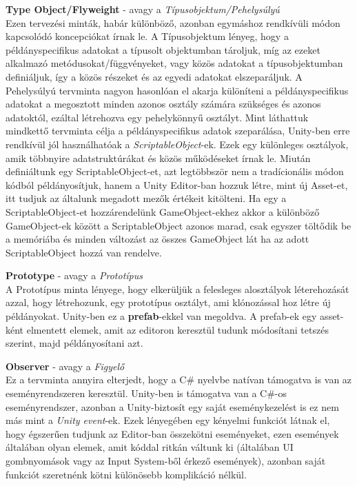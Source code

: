 \textbf{Type Object/Flyweight} - avagy a \textit{Típusobjektum/Pehelysúlyú}\\
Ezen tervezési minták, habár különböző, azonban egymáshoz rendkívüli módon kapcsolódó koncepciókat írnak le. A Típusobjektum lényeg, hogy a példányspecifikus adatokat a típusolt objektumban tároljuk, míg az ezeket alkalmazó metódusokat/függvényeket, vagy közös adatokat a típusobjektumban definiáljuk, így a közös részeket és az egyedi adatokat elszeparáljuk. A Pehelysúlyú tervminta nagyon hasonlóan el akarja különíteni a példányspecifikus adatokat a megosztott minden azonos osztály számára szükséges és azonos adatoktól, ezáltal létrehozva egy pehelykönnyű osztályt. Mint láthattuk mindkettő tervminta célja a példányspecifikus adatok szeparálása, Unity-ben erre rendkívül jól használhatóak a \textit{ScriptableObject}-ek. Ezek egy különleges osztályok, amik többnyire adatstruktúrákat és közös működéseket írnak le. Miután definiáltunk egy ScriptableObject-et, azt legtöbbször nem a tradícionális módon kódból példányosítjuk, hanem a Unity Editor-ban hozzuk létre, mint új Asset-et, itt tudjuk az általunk megadott mezők értékeit kitölteni. Ha egy a ScriptableObject-et hozzárendelünk GameObject-ekhez akkor a különböző GameObject-ek között a ScriptableObject azonos marad, csak egyszer töltődik be a memóriába és minden változást az összes GameObject lát ha az adott ScriptableObject hozzá van rendelve.

\textbf{Prototype} - avagy a \textit{Prototípus}\\
A Prototípus minta lényege, hogy elkerüljük a felesleges alosztályok léterehozását azzal, hogy létrehozunk, egy prototípus osztályt, ami klónozással hoz létre új példányokat. Unity-ben ez a \textbf{prefab}-ekkel van megoldva. A prefab-ek egy asset-ként elmentett elemek, amit az editoron keresztül tudunk módosítani tetszés szerint, majd példányosítani azt. 

\textbf{Observer} - avagy a \textit{Figyelő}\\
Ez a tervminta annyira elterjedt, hogy a C\# nyelvbe natívan támogatva is van az eseményrendszeren keresztül. Unity-ben is támogatva van a C\#-os eseményrendszer, azonban a Unity-biztosít egy saját eseménykezelést is ez nem más mint a \textit{Unity event}-ek. Ezek lényegében egy kényelmi funkciót látnak el, hogy égszerűen tudjunk az Editor-ban összekötni eseményeket, ezen események általában olyan elemek, amit kóddal ritkán váltunk ki (általában UI gombnyomások vagy az Input System-ből érkező események), azonban saját funkciót szeretnénk kötni különösebb komplikáció nélkül.

